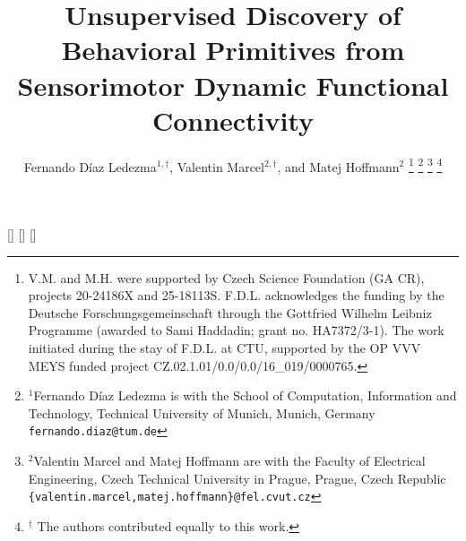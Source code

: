 \newacro{}[]{}
\newacro{}[]{}
\newacro{}[]{}

\title{\LARGE \bf
Unsupervised Discovery of Behavioral Primitives from Sensorimotor Dynamic Functional Connectivity
}

\author{Fernando D\'iaz Ledezma$^{1,\dagger}$, Valentin Marcel$^{2,\dagger}$, and Matej Hoffmann$^{2}$%
\thanks{V.M. and M.H. were supported by Czech Science Foundation (GA CR), projects 20-24186X and 25-18113S.  F.D.L. acknowledges the funding by the Deutsche Forschungsgemeinschaft through the Gottfried Wilhelm Leibniz Programme (awarded to Sami Haddadin; grant no. HA7372/3-1). The work initiated during the stay of F.D.L. at CTU, supported by the OP VVV MEYS funded project CZ.02.1.01/0.0/0.0/16\_019/0000765.}%
\thanks{$^{1}$Fernando D\'iaz Ledezma is with the School of Computation, Information and Technology, Technical University of Munich, Munich, Germany {\tt\small fernando.diaz@tum.de}}%
\thanks{$^{2}$Valentin Marcel and Matej Hoffmann are with the Faculty of Electrical Engineering, Czech Technical University in Prague, Prague, Czech Republic
        {\tt\small \{valentin.marcel,matej.hoffmann\}@fel.cvut.cz}}%
\thanks{$^\dagger$ The authors contributed equally to this work.}
}



\maketitle

